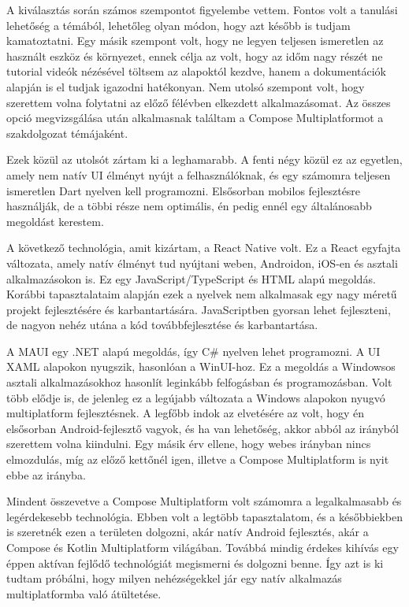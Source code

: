 A kiválasztás során számos szempontot figyelembe vettem. Fontos volt a tanulási lehetőség a témából, lehetőleg olyan módon, hogy azt később is tudjam kamatoztatni.  
Egy másik szempont volt, hogy ne legyen teljesen ismeretlen az használt eszköz és környezet, ennek célja az volt, hogy az időm nagy részét ne tutorial videók nézésével töltsem az alapoktól kezdve, hanem a dokumentációk alapján is el tudjak igazodni hatékonyan.  
Nem utolsó szempont volt, hogy szerettem volna folytatni az előző félévben elkezdett alkalmazásomat.  
Az összes opció megvizsgálása után alkalmasnak találtam a Compose Multiplatformot a szakdolgozat témájaként.

Ezek közül az utolsót zártam ki a leghamarabb. A fenti négy közül ez az egyetlen, amely nem natív UI élményt nyújt a felhasználóknak, és egy számomra teljesen ismeretlen Dart nyelven kell programozni. Elsősorban mobilos fejlesztésre használják, de a többi része nem optimális, én pedig ennél egy általánosabb megoldást kerestem. \cite{Flutter}  

A következő technológia, amit kizártam, a React Native volt. Ez a React egyfajta változata, amely natív élményt tud nyújtani weben, Androidon, iOS-en és asztali alkalmazásokon is.  
Ez egy JavaScript/TypeScript és HTML alapú megoldás. Korábbi tapasztalataim alapján ezek a nyelvek nem alkalmasak egy nagy méretű projekt fejlesztésére és karbantartására.  
JavaScriptben gyorsan lehet fejleszteni, de nagyon nehéz utána a kód továbbfejlesztése és karbantartása. \cite{ReactNative}  

A MAUI egy .NET alapú megoldás, így C\# nyelven lehet programozni. A UI XAML alapokon nyugszik, hasonlóan a WinUI-hoz.  
Ez a megoldás a Windowsos asztali alkalmazásokhoz hasonlít leginkább felfogásban és programozásban.  
Volt több elődje is, de jelenleg ez a legújabb változata a Windows alapokon nyugvó multiplatform fejlesztésnek.  
A legfőbb indok az elvetésére az volt, hogy én elsősorban Android-fejlesztő vagyok, és ha van lehetőség, akkor abból az irányból szerettem volna kiindulni.  
Egy másik érv ellene, hogy webes irányban nincs elmozdulás, míg az előző kettőnél igen, illetve a Compose Multiplatform is nyit ebbe az irányba. \cite{MAUI}  

Mindent összevetve a Compose Multiplatform volt számomra a legalkalmasabb és legérdekesebb technológia.  
Ebben volt a legtöbb tapasztalatom, és a későbbiekben is szeretnék ezen a területen dolgozni, akár natív Android fejlesztés, akár a Compose és Kotlin Multiplatform világában.  
Továbbá mindig érdekes kihívás egy éppen aktívan fejlődő technológiát megismerni és dolgozni benne.  
Így azt is ki tudtam próbálni, hogy milyen nehézségekkel jár egy natív alkalmazás multiplatformba való átültetése.
